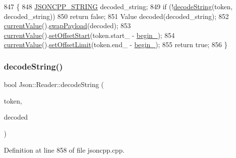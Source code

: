 \begin{DoxyCode}
847                                       \{
848   \hyperlink{json_8h_a1e723f95759de062585bc4a8fd3fa4be}{JSONCPP\_STRING} decoded\_string;
849   \textcolor{keywordflow}{if} (!\hyperlink{class_json_1_1_reader_aaf736937912f5c9b8d221e57f209e3e0}{decodeString}(token, decoded\_string))
850     \textcolor{keywordflow}{return} \textcolor{keyword}{false};
851   Value decoded(decoded\_string);
852   \hyperlink{class_json_1_1_reader_a85597f763fb0148a17359b6dfc6f7326}{currentValue}().\hyperlink{class_json_1_1_value_a5263476047f20e2fc6de470e4de34fe5}{swapPayload}(decoded);
853   \hyperlink{class_json_1_1_reader_a85597f763fb0148a17359b6dfc6f7326}{currentValue}().\hyperlink{class_json_1_1_value_a92e32ea0f4f8a15853a3cf0beac9feb9}{setOffsetStart}(token.start\_ - \hyperlink{class_json_1_1_reader_a327166839022ea91f0a8290960a8af76}{begin\_});
854   \hyperlink{class_json_1_1_reader_a85597f763fb0148a17359b6dfc6f7326}{currentValue}().\hyperlink{class_json_1_1_value_a5e4f5853fec138150c5df6004a8c2bcf}{setOffsetLimit}(token.end\_ - \hyperlink{class_json_1_1_reader_a327166839022ea91f0a8290960a8af76}{begin\_});
855   \textcolor{keywordflow}{return} \textcolor{keyword}{true};
856 \}
\end{DoxyCode}
\mbox{\label{class_json_1_1_reader_a8911a3225ee94d86d83edc2f8c1befe0}} 
\subsubsection{\texorpdfstring{decode\+String()}{decodeString()}\hspace{0.1cm}{\footnotesize\ttfamily [2/2]}}
{\footnotesize\ttfamily bool Json\+::\+Reader\+::decode\+String (\begin{DoxyParamCaption}\item[{\hyperlink{class_json_1_1_reader_1_1_token}{Token} \&}]{token,  }\item[{\hyperlink{json_8h_a1e723f95759de062585bc4a8fd3fa4be}{J\+S\+O\+N\+C\+P\+P\+\_\+\+S\+T\+R\+I\+NG} \&}]{decoded }\end{DoxyParamCaption})\hspace{0.3cm}{\ttfamily [private]}}



Definition at line 858 of file jsoncpp.\+cpp.



